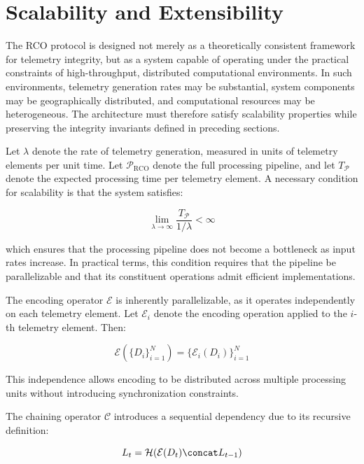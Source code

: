 \section{Scalability and Extensibility}

The RCO protocol is designed not merely as a theoretically consistent framework for telemetry integrity, but as a system capable of operating under the practical constraints of high-throughput, distributed computational environments. In such environments, telemetry generation rates may be substantial, system components may be geographically distributed, and computational resources may be heterogeneous. The architecture must therefore satisfy scalability properties while preserving the integrity invariants defined in preceding sections.

Let $\lambda$ denote the rate of telemetry generation, measured in units of telemetry elements per unit time. Let $\mathcal{P}_{\text{RCO}}$ denote the full processing pipeline, and let $T_{\mathcal{P}}$ denote the expected processing time per telemetry element. A necessary condition for scalability is that the system satisfies:

\begin{equation}
\lim_{\lambda \to \infty} \frac{T_{\mathcal{P}}}{1/\lambda} < \infty
\end{equation}

which ensures that the processing pipeline does not become a bottleneck as input rates increase. In practical terms, this condition requires that the pipeline be parallelizable and that its constituent operations admit efficient implementations.

The encoding operator $\mathcal{E}$ is inherently parallelizable, as it operates independently on each telemetry element. Let $\mathcal{E}_i$ denote the encoding operation applied to the $i$-th telemetry element. Then:

\begin{equation}
\mathcal{E}(\{D_i\}_{i=1}^{N}) = \{\mathcal{E}_i(D_i)\}_{i=1}^{N}
\end{equation}

This independence allows encoding to be distributed across multiple processing units without introducing synchronization constraints.

The chaining operator $\mathcal{C}$ introduces a sequential dependency due to its recursive definition:

\begin{equation}
L_t = \mathcal{H}(\mathcal{E}(D_t) \concat L_{t-1})
\end{equation}

